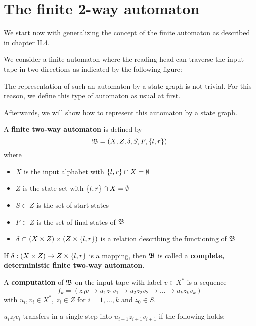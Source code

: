 \section{The finite 2-way automaton}

We start now with generalizing the concept of the finite automaton as described
in chapter II.4.

We consider a finite automaton where the reading head can traverse the input
tape in two directions as indicated by the following figure:

\begin{center}

\end{center}

The representation of such an automaton by a state graph is not trivial. For
this reason, we  define this type of automaton as usual at first.

Afterwards, we will show how to represent this automaton by a state graph.

\begin{definition}
A {\bf finite two-way automaton} is defined by
\[ \mbox{$\mathfrak{B}$} = (X, Z, \delta, S, F, \mbox{$\{l, r\}$}) \]
where 
\begin{itemize}
  \item $X$ is the input alphabet with $\mbox{$\{l, r\}$} \cap X = \emptyset$
  \item $Z$ is the state set with $\mbox{$\{l, r\}$} \cap X = \emptyset$
  \item $S \subset Z$ is the set of start states
  \item $F \subset Z$ is the set of final states of $\mbox{$\mathfrak{B}$}$
  \item $\delta \subset (X \times Z) \times (Z \times \mbox{$\{l, r\}$})$ is a
  relation describing the functioning of $\mbox{$\mathfrak{B}$}$
\end{itemize}

If $\delta : (X \times Z) \to Z \times \mbox{$\{l, r\}$}$ is a mapping, then $\mbox{$\mathfrak{B}$}$
is called a {\bf complete, deterministic finite two-way automaton}.
\end{definition}

\bigskip
\begin{definition}
A {\bf computation} of $\mbox{$\mathfrak{B}$}$ on the input tape with label $v \in X^*$ is a
sequence
\[ f_k = (z_0 v \to u_1 z_1 v_1 \to u_2 z_2 v_2 \to \ldots \to u_k z_k v_k) \]
with $u_i, v_i \in X^*,\ z_i \in Z$ for $i = 1, \ldots, k$ and $z_0 \in S$. 
\end{definition}

$u_i z_i v_i$ transfers in a single step into $u_{i+1} z_{i+1} v_{i+1}$ if the
following holds:

